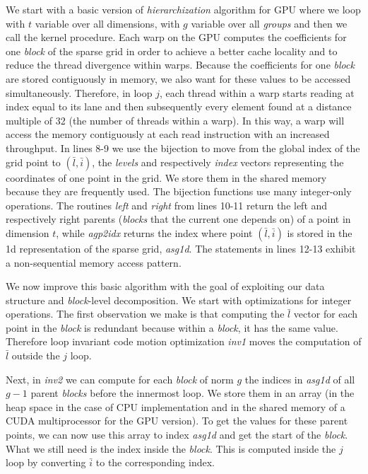 We start with a basic version of \textit{hierarchization} algorithm for GPU
where we loop with $t$ variable over all dimensions, with $g$ variable over all
\textit{groups} and then we call the kernel procedure. Each warp on the GPU
computes the coefficients for one \textit{block} of the sparse grid in order to
achieve a better cache locality and to reduce the thread divergence within
warps. Because the coefficients for one \textit{block} are stored contiguously
in memory, we also want for these values to be accessed simultaneously.
Therefore, in loop $j$, each thread within a warp starts reading at index equal
to its lane and then subsequently every element found at a distance multiple of 32 (the
number of threads within a warp). In this way, a warp will access the memory
contiguously at each read instruction with an increased throughput. In lines
8-9 we use the bijection to move from the global index of the grid point to
$(\bar{l}, \bar{i})$, the \textit{levels} and respectively \textit{index}
vectors representing the coordinates of one point in the grid. We store them in the
shared memory because they are frequently used. The bijection functions use many
integer-only operations. The routines \textit{left} and \textit{right}
from lines 10-11 return the left and respectively right parents (\textit{blocks}
that the current one depends on) of a point in dimension $t$, while
\textit{agp2idx} returns the index where point $(\bar{l}, \bar{i})$ is stored in
the 1d representation of the sparse grid, \textit{asg1d}. The statements in
lines 12-13 exhibit a non-sequential memory access pattern.

We now improve this basic algorithm with the goal of exploiting our data
structure and \textit{block}-level decomposition. We start with optimizations
for integer operations. The first observation we make is that computing the
$\bar{l}$ vector for each point in the \textit{block} is redundant because
within a \textit{block}, it has the same value. Therefore loop invariant code
motion optimization \textit{inv1} moves the computation of $\bar{l}$ outside the
$j$ loop.

Next, in \textit{inv2} we can compute for each \textit{block} of norm $g$ the
indices in \textit{asg1d} of all $g-1$ parent \textit{blocks} before the innermost
loop. We store them in an array (in the heap space in the case of CPU
implementation and in the shared memory of a CUDA multiprocessor for the GPU
version). To get the values for these parent points, we can now use this array
to index \textit{asg1d} and get the start of the \textit{block}. What we still need is
the index inside the \textit{block}. This is computed inside the $j$ loop by
converting $\bar{i}$ to the corresponding index.

